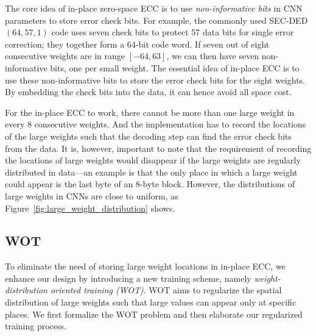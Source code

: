 \documentclass{article}
\newcommand{\TODO}[1]{{\it \color{blue}\{TODO: #1\}}}
\begin{document}
The core idea of  in-place zero-space ECC is to use {\em non-informative bits} in CNN parameters to store error check bits. For example, the commonly used SEC-DED $(64, 57, 1)$ code uses seven check bits to protect 57 data bits for single error correction; they together form a 64-bit code word. If seven out of eight consecutive weights are in range $[-64, 63]$, we can then have seven non-informative bits, one per small weight. The essential idea of  in-place ECC is to use these non-informative bits to store the error check bits for the eight weights. By embedding the check bits into the data, it can hence avoid all space cost.

For the in-place ECC to work, there cannot be more than one large weight in every 8 consecutive weights. And the implementation has to record the locations of the large weights such that the decoding step can find the error check bits from the data. %
% 
It is, however, important to note that the requirement of recording the locations of large weights would disappear if the large weights are regularly distributed in data---an example is that the only place in which a large weight could appear is the last byte of an 8-byte block. However, the distributions of large weights in CNNs are close to uniform, as Figure~\ref{fig:large_weight_distribution} shows. 

\subsection{WOT}%

To eliminate the need of storing large weight locations in in-place ECC, we enhance our design by introducing a new training scheme, namely {\em weight-distribution oriented training (WOT)}. WOT aims to regularize the spatial distribution of large weights such that large values can appear only at specific places. We first formalize the WOT problem and then elaborate our regularized training process.   
\end{document}
